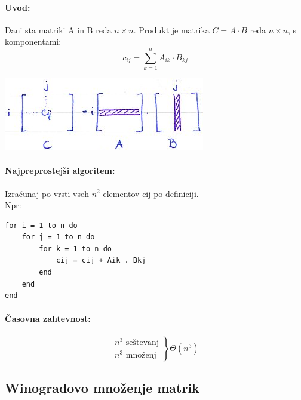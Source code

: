 \documentclass[a4paper,10pt]{article}
\begin{document}
\paragraph{Uvod:}
Dani sta matriki A in B reda $n \times n$. Produkt je matrika $C = A \cdot B$ reda  $n \times n$, s komponentami:
$$c_{ij} = \sum_{k=1}^n A_{ik} \cdot B_{kj}$$
	\begin{center}
	\includegraphics{Slike/MnozenjeMatrikUvod.jpg}
	\end{center}

\paragraph{Najpreprostej\v si algoritem:}
Izra\v cunaj po vrsti vseh $n^2$ elementov cij po definiciji.\\
Npr:
\begin{lstlisting}
for i = 1 to n do
    for j = 1 to n do
        for k = 1 to n do
            cij = cij + Aik . Bkj 
        end
    end
end
\end{lstlisting}

\paragraph{\v Casovna zahtevnost:}
$$
\left. 
\begin{array}{l}
n^3 \mbox{ se\v stevanj}\\
n^3 \mbox{ mno\v zenj}
\end{array}
\right\rbrace \Theta (n^3)
$$

\subsection{Winogradovo mno\v zenje matrik}
\end{document}
